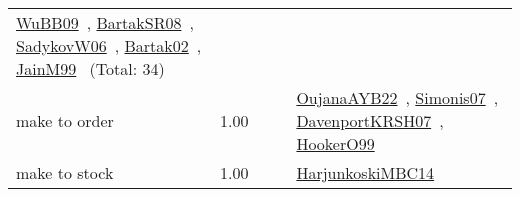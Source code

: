 {\begin{longtable}{p{3cm}r>{\raggedright\arraybackslash}p{6cm}>{\raggedright\arraybackslash}p{6cm}>{\raggedright\arraybackslash}p{8cm}}
\href{../works/WuBB09.pdf}{WuBB09}~\cite{WuBB09}, \href{../works/BartakSR08.pdf}{BartakSR08}~\cite{BartakSR08}, \href{../works/SadykovW06.pdf}{SadykovW06}~\cite{SadykovW06}, \href{../works/Bartak02.pdf}{Bartak02}~\cite{Bartak02}, \href{../works/JainM99.pdf}{JainM99}~\cite{JainM99} (Total: 34)\\
\index{make to order}\index{Concepts!make to order}make to order &  1.00 &  &  & \href{../works/OujanaAYB22.pdf}{OujanaAYB22}~\cite{OujanaAYB22}, \href{../works/Simonis07.pdf}{Simonis07}~\cite{Simonis07}, \href{../works/DavenportKRSH07.pdf}{DavenportKRSH07}~\cite{DavenportKRSH07}, \href{../works/HookerO99.pdf}{HookerO99}~\cite{HookerO99}\\
\index{make to stock}\index{Concepts!make to stock}make to stock &  1.00 &  &  & \href{../works/HarjunkoskiMBC14.pdf}{HarjunkoskiMBC14}~\cite{HarjunkoskiMBC14}\\

\end{longtable}}
